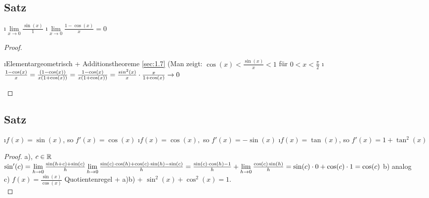 \subsection[Satz]{Satz}\label{sec:6.7}
\begin{enumerate}[a)]
\i $\lim\limits_{x \to 0} \frac{\sin(x)}{1}$
\i $\lim\limits_{x \to 0} \frac{1-\cos(x)}{x} = 0$
\end{enumerate}
\begin{proof}\ \\
\begin{enumerate}[a)]
\i Elementargeometrisch + Additionstheoreme \ref{sec:1.7}
(Man zeigt: $\cos(x) < \frac{\sin(x)}{x} < 1$ für $0 < x < \frac{\pi}{2}$
\i $\frac{1-\cos(x)}{x} = \frac{(1-\cos(x))}{x(1+\cos(x))} = \frac{1-\cos(x)}{x(1 + \cos(x))} = \frac{sin^2(x)}{x} \cdot \frac{x}{1 + \cos(x)} \to 0$
\end{enumerate}
\end{proof}
\subsection[Satz: Ableitungsregeln von cosinus und sinus]{Satz}
\begin{enumerate}[a)]
\i $f(x) = \sin(x)$, so $f'(x) = \cos(x)$
\i $f(x) = \cos(x),$ so $f'(x) = -\sin(x)$
\i $f(x) = \tan(x)$, so $f'(x) = 1 + \tan^2(x)$
\end{enumerate}
\begin{proof}
a), $c \in \mathbb{R}$\\
$\sin'(c) = \lim\limits_{h \to 0}\frac{\sin(h+c) + \sin(c)}{h}\\
\lim\limits_{h \to 0} \frac{\sin(c) \cdot \cos(h) + \cos(c) \cdot \sin(h) - \sin(c)}{h}\\
= \frac{\sin(c) \cdot \cos(h) -1}{h} + \lim\limits_{h \to 0} \frac{\cos(c)\sin(h)}{h} = \sin(c) \cdot 0 + \cos(c) \cdot 1 = \cos(c)$
b) analog\\
c) $f(x) = \frac{\sin(x)}{\cos(x)}$ Quotientenregel + a)b) + $\sin^2(x) + \cos^2(x) =1$.\\
\end{proof}
